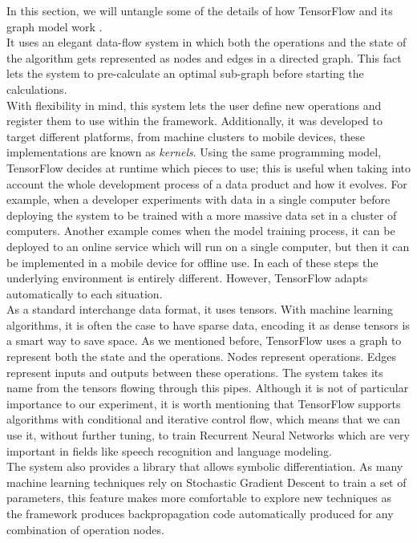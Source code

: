 In this section, we will untangle some of the details of how TensorFlow and its graph model work \cite{DBLP:journals/corr/AbadiBCCDDDGIIK16}.\\

It uses an elegant data-flow system in which both the operations and the state of the algorithm gets represented as nodes and edges in a directed graph. This fact lets the system to pre-calculate an optimal sub-graph before starting the calculations.\\

With flexibility in mind, this system lets the user define new operations and register them to use within the framework. Additionally, it was developed to target different platforms, from machine clusters to mobile devices, these implementations are known as \textit{kernels}. Using the same programming model, TensorFlow decides at runtime which pieces to use; this is useful when taking into account the whole development process of a data product and how it evolves. For example, when a developer experiments with data in a single computer before deploying the system to be trained with a more massive data set in a cluster of computers. Another example comes when the model training process, it can be deployed to an online service which will run on a single computer, but then it can be implemented in a mobile device for offline use. In each of these steps the underlying environment is entirely different. However, TensorFlow adapts automatically to each situation.\\


As a standard interchange data format, it uses tensors. With machine learning algorithms, it is often the case to have sparse data, encoding it as dense tensors is a smart way to save space. As we mentioned before, TensorFlow uses a graph to represent both the state and the operations. Nodes represent operations. Edges represent inputs and outputs between these operations. The system takes its name from the tensors flowing through this pipes. Although it is not of particular importance to our experiment, it is worth mentioning that TensorFlow supports algorithms with conditional and iterative control flow, which means that we can use it, without further tuning, to train Recurrent Neural Networks which are very important in fields like speech recognition and language modeling.\\

The system also provides a library that allows symbolic differentiation. As many machine learning techniques rely on Stochastic Gradient Descent to train a set of parameters, this feature makes more comfortable to explore new techniques as the framework produces backpropagation code automatically produced for any combination of operation nodes.\\

